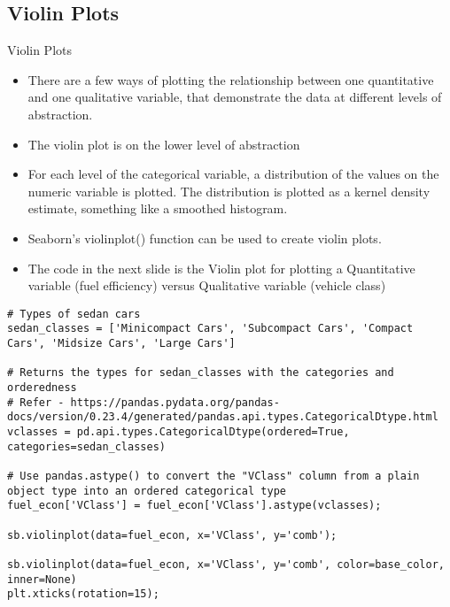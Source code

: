 \documentclass[12pt]{beamer}
\begin{document}
\subsection{Violin Plots}
    \begin{frame}{Violin Plots}
    	\begin{itemize}
    		\item There are a few ways of plotting the relationship between one quantitative and one qualitative variable, that demonstrate the data at different levels of abstraction.
    		\item The violin plot is on the lower level of abstraction
    		\item For each level of the categorical variable, a distribution of the values on the numeric variable is plotted. The distribution is plotted as a kernel density estimate, something like a smoothed histogram.
    		\item Seaborn's violinplot() function can be used to create violin plots.
    		\item The code in the next slide is the Violin plot for plotting a Quantitative variable (fuel efficiency) versus Qualitative variable (vehicle class)
    	\end{itemize}
    \end{frame}
    \begin{frame}[fragile]{}
    	\fontsize{10}{1}
    	\begin{verbatim}
# Types of sedan cars
sedan_classes = ['Minicompact Cars', 'Subcompact Cars', 'Compact Cars', 'Midsize Cars', 'Large Cars']

# Returns the types for sedan_classes with the categories and orderedness
# Refer - https://pandas.pydata.org/pandas-docs/version/0.23.4/generated/pandas.api.types.CategoricalDtype.html
vclasses = pd.api.types.CategoricalDtype(ordered=True, categories=sedan_classes)

# Use pandas.astype() to convert the "VClass" column from a plain object type into an ordered categorical type 
fuel_econ['VClass'] = fuel_econ['VClass'].astype(vclasses);

sb.violinplot(data=fuel_econ, x='VClass', y='comb');

sb.violinplot(data=fuel_econ, x='VClass', y='comb', color=base_color, inner=None)
plt.xticks(rotation=15);
    	\end{verbatim}
    	\begin{figure}
    		\centering
    		\qquad
    	\end{figure}
    \end{frame}
\end{document}
